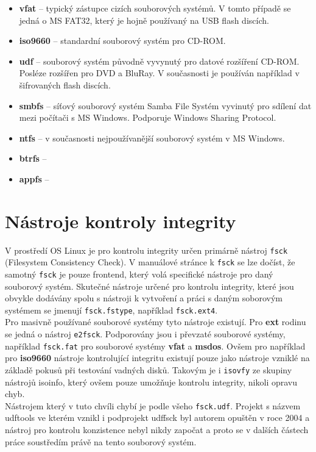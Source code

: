 \begin{itemize}
    \item \textbf{vfat} -- typický zástupce cizích souborových systémů. V tomto případě se jedná o MS FAT32, který je hojně používaný na USB flash discích.
    \item \textbf{iso9660} -- standardní souborový systém pro CD-ROM. 
    \item \textbf{udf} -- souborový systém původně vyvynutý pro datové rozšíření CD-ROM. Posléze rozšířen pro DVD a BluRay. V současnosti je používán například v šifrovaných flash discích. 
    \item \textbf{smbfs} -- síťový souborový systém Samba File Systém vyvinutý pro sdílení dat mezi počítači s MS Windows. Podporuje Windows Sharing Protocol.
    \item \textbf{ntfs} -- v současnosti nejpoužívanější souborový systém v MS Windows. 
    \item \textbf{btrfs} -- 
    \item \textbf{appfs} -- 
\end{itemize}

\section{Nástroje kontroly integrity}
V prostředí OS Linux je pro kontrolu integrity určen primárně nástroj \texttt{fsck} (Filesystem Consistency Check). V manuálové stránce k \texttt{fsck} \cite{man-fsck} se lze dočíst, že samotný \texttt{fsck} je pouze frontend, který volá specifické nástroje pro daný souborový systém. Skutečné nástroje určené pro kontrolu integrity, které jsou obvykle dodávány spolu s nástroji k vytvoření a práci s daným soborovým systémem se jmenují \texttt{fsck.fstype}, například \texttt{fsck.ext4}.\\
Pro masivně používané souborové systémy tyto nástroje existují. Pro \textbf{ext} rodinu se jedná o nástroj \texttt{e2fsck}. Podporovány jsou i převzaté souborové systémy, například \texttt{fsck.fat} pro souborové systémy \textbf{vfat} a \textbf{msdos}. Ovšem pro například pro \textbf{iso9660} nástroje kontrolující integritu existují pouze jako nástroje vzniklé na základě pokusů při testování vadných disků. Takovým je i \texttt{isovfy} \cite{man-isovfy} ze skupiny nástrojů isoinfo, který ovšem pouze umožňuje kontrolu integrity, nikoli opravu chyb.\\
Nástrojem který v tuto chvíli chybí je podle všeho \texttt{fsck.udf}. Projekt s názvem udftools \cite{udftools-sourceforge} ve kterém vznikl i podprojekt udffsck byl autorem opuštěn v roce 2004 a nástroj pro kontrolu konzistence nebyl nikdy započat a proto se v dalších částech práce soustředím právě na tento souborový systém. 

